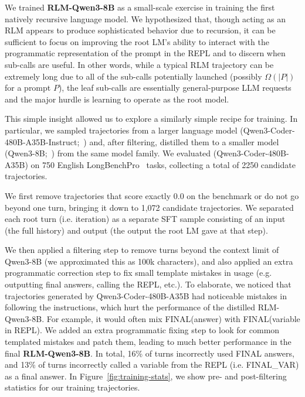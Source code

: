 

We trained \textbf{RLM-Qwen3-8B} as a small-scale exercise in training the first natively recursive language model. We hypothesized that, though acting as an RLM appears to produce sophisticated behavior due to recursion, it can be sufficient to focus on improving the root LM's ability to interact with the programmatic representation of the prompt in the REPL and to discern when sub-calls are useful.
In other words, while a typical RLM trajectory can be extremely long due to all of the sub-calls potentially launched (possibly $\Omega(|P|)$ for a prompt $P$), the leaf sub-calls are essentially general-purpose LLM requests and the major hurdle is learning to operate as the root model.

This simple insight allowed us to explore a similarly simple recipe for training. In particular, we sampled \RLM{} trajectories from a larger language model (Qwen3-Coder-480B-A35B-Instruct;~\citealt{Qwen3-Coder-480B-A35B}) and, after filtering, distilled them to a smaller model (Qwen3-8B;~\citealt{Qwen3-8B}) from the same model family.
We evaluated \RLM(Qwen3-Coder-480B-A35B) on 750 English LongBenchPro~\citep{chen2026longbenchprorealisticcomprehensive} tasks, collecting a total of 2250 candidate trajectories. 

We first remove trajectories that score exactly 0.0 on the benchmark or do not go beyond one turn, bringing it down to 1,072 candidate trajectories. We separated each root \RLM{} turn (i.e. iteration) as a separate SFT sample consisting of an input (the full history) and output (the output the root LM gave at that step).

We then applied a filtering step to remove turns beyond the context limit of Qwen3-8B (we approximated this as 100k characters), and also applied an extra programmatic correction step to fix small template mistakes in \RLM{} usage (e.g. outputting final answers, calling the REPL, etc.). 
To elaborate, we noticed that trajectories generated by Qwen3-Coder-480B-A35B had noticeable mistakes in following the \RLM{} instructions, which hurt the performance of the distilled RLM-Qwen3-8B. For example, it would often mix FINAL(answer) with FINAL(variable in REPL). We added an extra programmatic fixing step to look for common templated mistakes and patch them, leading to much better performance in the final \textbf{RLM-Qwen3-8B}. In total, 16\% of turns incorrectly used FINAL answers, and 13\% of turns incorrectly called a variable from the REPL (i.e. FINAL\_VAR) as a final answer. In Figure~\ref{fig:training-stats}, we show pre- and post-filtering statistics for our training trajectories.

